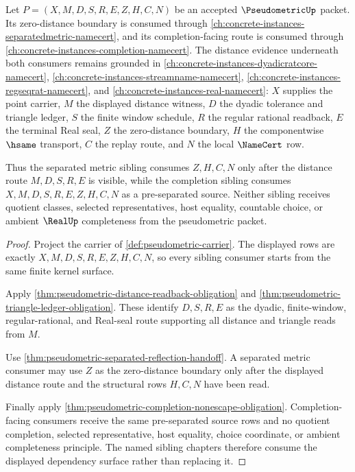 \begin{theorem}
\label{thm:pseudometric-scoped-kernel-dependency-surface}
Let $P=(X,M,D,S,R,E,Z,H,C,N)$ be an accepted $\PseudometricUp$ packet. Its zero-distance boundary is consumed through \autoref{ch:concrete-instances-separatedmetric-namecert}, and its completion-facing route is consumed through \autoref{ch:concrete-instances-completion-namecert}. The distance evidence underneath both consumers remains grounded in \autoref{ch:concrete-instances-dyadicratcore-namecert}, \autoref{ch:concrete-instances-streamname-namecert}, \autoref{ch:concrete-instances-regseqrat-namecert}, and \autoref{ch:concrete-instances-real-namecert}: $X$ supplies the point carrier, $M$ the displayed distance witness, $D$ the dyadic tolerance and triangle ledger, $S$ the finite window schedule, $R$ the regular rational readback, $E$ the terminal Real seal, $Z$ the zero-distance boundary, $H$ the componentwise $\hsame$ transport, $C$ the replay route, and $N$ the local $\NameCert$ row.

Thus the separated metric sibling consumes $Z,H,C,N$ only after the distance route $M,D,S,R,E$ is visible, while the completion sibling consumes $X,M,D,S,R,E,Z,H,C,N$ as a pre-separated source. Neither sibling receives quotient classes, selected representatives, host equality, countable choice, or ambient $\RealUp$ completeness from the pseudometric packet.
\end{theorem}
\begin{proof}
Project the carrier of \autoref{def:pseudometric-carrier}. The displayed rows are exactly $X,M,D,S,R,E,Z,H,C,N$, so every sibling consumer starts from the same finite kernel surface.

Apply \autoref{thm:pseudometric-distance-readback-obligation} and \autoref{thm:pseudometric-triangle-ledger-obligation}. These identify $D,S,R,E$ as the dyadic, finite-window, regular-rational, and Real-seal route supporting all distance and triangle reads from $M$.

Use \autoref{thm:pseudometric-separated-reflection-handoff}. A separated metric consumer may use $Z$ as the zero-distance boundary only after the displayed distance route and the structural rows $H,C,N$ have been read.

Finally apply \autoref{thm:pseudometric-completion-nonescape-obligation}. Completion-facing consumers receive the same pre-separated source rows and no quotient completion, selected representative, host equality, choice coordinate, or ambient completeness principle. The named sibling chapters therefore consume the displayed dependency surface rather than replacing it.
\end{proof}

